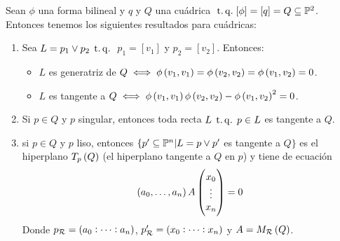 \begin{prop}
 Sean $\phi$ una forma bilineal y $q$ y $Q$ una cuádrica $\operatorname{\;t.q.\;} [\phi]=[q]=Q\subseteq \mathbb{P}^2$.
 Entonces tenemos los siguientes resultados para cuádricas:
 \begin{enumerate}[(1)]
  \item Sea $L=p_1\vee p_2 \operatorname{\;t.q.\;}$ $p_1=[v_1]$ y $p_2=[v_2]$. Entonces:
  \begin{itemize}
   \item $L$ es generatriz de $Q \iff \phi \left( v_1,v_1\right) = \phi
   \left( v_2,v_2 \right) = \phi \left( v_1,v_2 \right) =0$.
   \item $L$ es tangente a $Q \iff \phi \left( v_1,v_1 \right) \phi \left( v_2,v_2 \right)
   - \phi \left( v_1,v_2 \right) ^2 =0$.
  \end{itemize}
  \item Si $p\in Q$ y $p$ singular, entonces toda recta $L \operatorname{\;t.q.\;} p\in L$ es tangente a $Q$.
  \item si $p\in Q$ y $p$ liso, entonces $\{ p'\subseteq \mathbb{P}^n | L=p\vee p'$ es tangente a $Q \}$
  es el hiperplano $T_p\left( Q \right)$ (el hiperplano tangente a $Q$ en $p$) y tiene de ecuación
  \[
   \left( a_0,\dots,a_n \right) A 
   \begin{pmatrix}
    x_0\\
    \vdots\\
    x_n\\
   \end{pmatrix} = 0
  \]
  Donde $p_{\mathcal{R}} = \left( a_0:\dots :a_n\right)$, $p'_{\mathcal{R}} = \left( x_0:\dots :x_n\right)$ y $A = M_{\mathcal{R}} \left( Q \right)$.
 \end{enumerate}
\end{prop}
